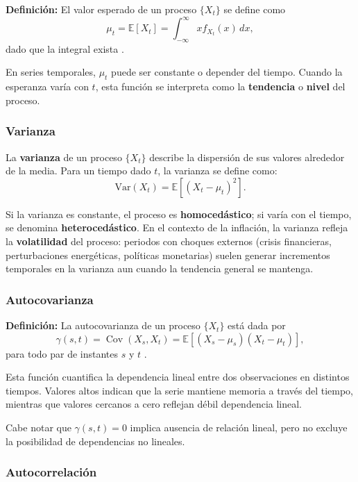 \documentclass[12pt,letterpaper]{article}
\begin{document}
\textbf{Definición:} El valor esperado de un proceso $\{X_t\}$ se define como
\[
\mu_t = \mathbb{E}[X_t] = \int_{-\infty}^{\infty} x f_{X_t}(x)\, dx,
\]
dado que la integral exista \cite{shumway2006time}.

En series temporales, $\mu_t$ puede ser constante o depender del tiempo. 
Cuando la esperanza varía con $t$, esta función se interpreta como la 
\textbf{tendencia} o \textbf{nivel} del proceso.

\subsubsection{Varianza}

La \textbf{varianza} de un proceso $\{X_t\}$ describe la dispersión de sus valores 
alrededor de la media. Para un tiempo dado $t$, la varianza se define como:
\[
\mathrm{Var}(X_t) = \mathbb{E}[(X_t - \mu_t)^2].
\]

Si la varianza es constante, el proceso es \textbf{homocedástico}; si varía con el tiempo,
se denomina \textbf{heterocedástico}. En el contexto de la inflación, la varianza refleja
la \textbf{volatilidad} del proceso: periodos con choques externos (crisis financieras,
perturbaciones energéticas, políticas monetarias) suelen generar incrementos temporales en 
la varianza aun cuando la tendencia general se mantenga.

\subsubsection{Autocovarianza}

\textbf{Definición:} La autocovarianza de un proceso $\{X_t\}$ está dada por
\[
\gamma(s,t) = \operatorname{Cov}(X_s, X_t)
= \mathbb{E}\!\left[(X_s - \mu_s)(X_t - \mu_t)\right],
\]
para todo par de instantes $s$ y $t$ \cite{shumway2006time}. 

Esta función cuantifica la dependencia lineal entre dos observaciones en distintos tiempos.
Valores altos indican que la serie mantiene memoria a través del tiempo, mientras que valores 
cercanos a cero reflejan débil dependencia lineal.

Cabe notar que $\gamma(s,t)=0$ implica ausencia de relación lineal, pero no excluye la
posibilidad de dependencias no lineales.

\subsubsection{Autocorrelación}
\end{document}

